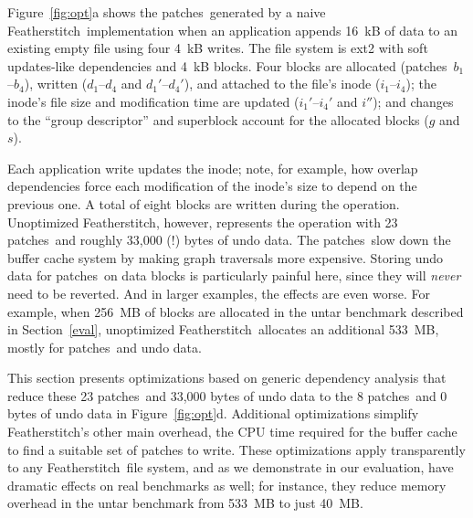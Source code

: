 \documentclass[9pt,twocolumn,letterpaper]{article}
\newcommand{\Kudos}{Featherstitch}
\newcommand{\patch}{patch}
\newcommand{\patches}{patches}
\begin{document}
Figure~\ref{fig:opt}a shows the \patches\ generated by a naive \Kudos\
implementation when an application appends
16~kB of data to an existing empty file using four 4~kB writes.
%
The file system is ext2 with soft updates-like
dependencies and 4~kB blocks.
%
%
%
%
Four blocks are allocated (\patches\ $b_1$--$b_4$),
written ($d_1$--$d_4$ and $d_1'$--$d_4'$), and attached to the file's
inode ($i_1$--$i_4$); the inode's file size and modification time are updated
($i_1'$--$i_4'$ and $i''$); and changes to the ``group descriptor'' and superblock
account for the allocated blocks ($g$ and $s$).
%
\begin{comment}
The operation is broken into four one-block appends; the numeric subscripts in
the \patch\ labels indicate with which each \patch\ is associated.
\end{comment}
%
Each application write updates the inode; note, for example, how overlap
dependencies force each modification of the inode's size to depend on the
previous one.
%
A total of eight blocks are written during the operation.
%
Unoptimized \Kudos, however, represents the operation with 23 \patches\ and
roughly 33,000 (!) bytes of undo data.
%
The \patches\ slow down the buffer cache system by making graph traversals
more expensive.
%
Storing undo data for \patches\ on data blocks is particularly painful
here, since they will \emph{never} need to be reverted.
%
And in larger examples, the effects are even worse. For example, when
256~MB of blocks are allocated in the untar benchmark described in
Section~\ref{eval}, unoptimized \Kudos\ allocates an additional 533~MB,
mostly for \patches\ and undo data.

This section presents optimizations based on generic
dependency analysis that reduce these 23 \patches\ and 33,000 bytes
of undo data to the 8 \patches\ and 0 bytes of
undo data in Figure~\ref{fig:opt}d.
%
Additional optimizations simplify \Kudos's other main overhead, the CPU
time required for the buffer cache to find a suitable set of patches to
write.
%
These optimizations apply transparently to any \Kudos\ file system, and as
we demonstrate in our evaluation, have dramatic effects on real benchmarks
as well; for instance, they reduce memory overhead in the untar benchmark
from 533~MB to just 40~MB.
\end{document}

